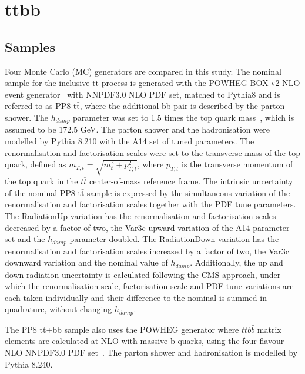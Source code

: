 \section{ttbb}
\label{sec:ttbb}

\subsection{Samples}
Four Monte Carlo (MC) generators are compared in this study. %
The nominal sample for the inclusive $\mathrm{t\bar{t}}$ process is generated with the \textsc{POWHEG-BOX v2} NLO event generator~\cite{Nason:2004rx,Frixione:2007vw,Alioli:2010xd,Campbell:2014kua} with NNPDF3.0 NLO PDF set, matched to Pythia8 and is referred to as PP8 $\mathrm{t\bar{t}}$, where the additional bb-pair is described by the parton shower. The $h_{damp}$ parameter was set to 1.5 times the top quark mass~\cite{ATL-PHYS-PUB-2016-020}, which is assumed to be 172.5 GeV. The parton shower and the hadronisation were modelled by Pythia 8.210 with the A14 set of tuned parameters. The renormalisation and factorisation scales were set to the transverse mass of the top quark, defined as $m_{T,t} = \sqrt{m^2_t + p^2_{T,t}}$, where $p_{T,t}$ is the transverse momentum of the top quark in the $t\overline{t}$ center-of-mass reference frame.
The intrinsic uncertainty of the nominal PP8 $\mathrm{t\bar{t}}$ sample is expressed by the simultaneous variation of the renormalisation and factorisation scales together with the PDF tune parameters. The RadiationUp variation has the renormalisation and factorisation scales decreased by a factor of two, the Var3c upward variation of the A14 parameter set and the $h_{damp}$ parameter doubled. The RadiationDown variation has the renormalisation and factorisation scales increased by a factor of two, the Var3c downward variation and the nominal value of $h_{damp}$.
Additionally, the up and down radiation uncertainty is calculated following the CMS approach, under which the renormalisation scale, factorisation scale and PDF tune variations are each taken individually and their difference to the nominal is summed in quadrature, without changing $h_{damp}$.

The PP8 tt+bb sample also uses the POWHEG generator where $t\bar{t}b\bar{b}$ matrix elements are calculated at NLO with massive b-quarks, using the four-flavour NLO NNPDF3.0 PDF set~\cite{Jezo:2018yaf}. The parton shower and hadronisation is modelled by Pythia 8.240.

